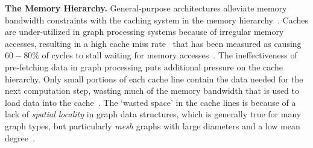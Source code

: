 \textbf{The Memory Hierarchy.} General-purpose architectures alleviate memory bandwidth constraints with the caching system in the memory hierarchy~\cite{Hennessy2019}.
Caches are under-utilized in graph processing systems because of irregular memory accesses, resulting in a high cache miss rate~\cite{Song2016} that has been measured as causing $60-80\%$ of cycles to stall waiting for memory accesses~\cite{Zhang2017}.
The ineffectiveness of pre-fetching data in graph processing puts additional pressure on the cache hierarchy.
Only small portions of each cache line contain the data needed for the next computation step, wasting much of the memory bandwidth that is used to load data into the cache~\cite{Ham2016, Mukkara2018, Aananthakrishnan2020}. 
The `wasted space' in the cache lines is because of a lack of \textit{spatial locality} in graph data structures, which is generally true for many graph types, but particularly \textit{mesh} graphs with large diameters and a low mean degree~\cite{Oguntebi2016, Ham2016}.




